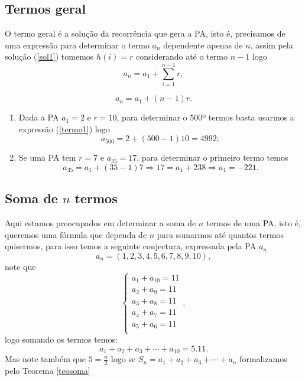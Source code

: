 \subsection{Termos geral}
\quad O termo geral é a solução da recorrência que gera a PA, isto é, precisamos de uma expressão para determinar o termo $a_n$ dependente apenas de $n$, assim pela solução (\ref{sol1}) tomemos $h(i) = r$ considerando até o termo $n-1$ logo
    $$ a_n = a_1 + \sum_{i=1}^{n-1}r ,$$

\begin{equation}
\label{termo1}
 a_n = a_1 + (n-1)r.
\end{equation}
\begin{example}
\begin{enumerate}
    \item [(i)] Dada a PA $a_1 = 2$ e $r=10$, para determinar o 500º termos basta usarmos a expressão (\ref{termo1}) logo
    $$a_{500} = 2 + (500-1)10 = 4992;$$
    \item[(ii)] Se uma PA tem $r=7$ e $a_{35} = 17$, para determinar o primeiro termo temos
    $$a_{35} = a_1 + (35-1)7 \Rightarrow 17 = a_1 + 238 \Rightarrow a_1 = -221.$$
\end{enumerate}

\end{example}
\subsection{Soma de $n$ termos}
Aqui estamos preocupados em determinar a soma de $n$ termos de uma PA, isto é, queremos uma fórmula que dependa de $n$ para somarmos até quantos termos quisermos, para isso temos a seguinte conjectura, expressada pela PA $a_n$
$$a_n = (1,2,3,4,5,6,7,8,9,10),$$
note que 
\begin{equation}
    \begin{cases}
    a_1 + a_{10} = 11\\
    a_2 + a_9 = 11\\
    a_3 + a_8 = 11\\
    a_4 + a_7 = 11\\
    a_5 + a_6 = 11\\
    \end{cases},
\end{equation}
logo somando os termos temos:
$$a_1+a_2+a_3 + \cdots + a_{10} = 5.11.$$
\inic  Mas note também que $5 = \frac{n}{2}$ logo  se $S_n = a_1 + a_2 + a_3 + \cdots + a_n$ formalizamos pelo Teorema \ref{teosoma}

